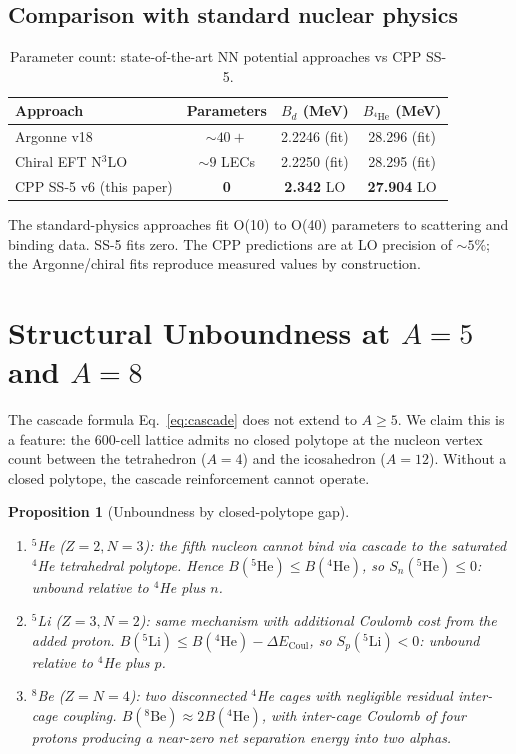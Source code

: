 \documentclass[11pt,letterpaper]{article}
\newtheorem{proposition}[theorem]{Proposition}
\newcommand{\Bd}{B_{d}}
\begin{document}
\subsection{Comparison with standard nuclear physics}

\begin{table}[H]
\centering
\caption{Parameter count: state-of-the-art NN potential approaches vs CPP SS-5.}
\label{tab:comparison}
\begin{tabular}{@{}lccc@{}}
\toprule
Approach & Parameters & $\Bd$ (MeV) & $B_{{}^4\mathrm{He}}$ (MeV) \\
\midrule
Argonne v18 & $\sim 40+$ & 2.2246 (fit) & 28.296 (fit) \\
Chiral EFT N$^3$LO & $\sim 9$ LECs & 2.2250 (fit) & 28.295 (fit) \\
CPP SS-5 v6 (this paper) & \textbf{0} & \textbf{2.342} LO & \textbf{27.904} LO \\
\bottomrule
\end{tabular}
\end{table}

The standard-physics approaches fit O(10) to O(40) parameters to scattering and binding data. SS-5 fits zero. The CPP predictions are at LO precision of $\sim 5\%$; the Argonne/chiral fits reproduce measured values by construction.

\section{Structural Unboundness at $A = 5$ and $A = 8$}
\label{sec:unbound}

The cascade formula Eq.~\ref{eq:cascade} does not extend to $A \geq 5$. We claim this is a feature: the 600-cell lattice admits no closed polytope at the nucleon vertex count between the tetrahedron ($A = 4$) and the icosahedron ($A = 12$). Without a closed polytope, the cascade reinforcement cannot operate.

\begin{proposition}[Unboundness by closed-polytope gap]
\label{prop:unbound}
\begin{enumerate}
\item ${}^5$He ($Z=2, N=3$): the fifth nucleon cannot bind via cascade to the saturated ${}^4$He tetrahedral polytope. Hence $B({}^5\text{He}) \leq B({}^4\text{He})$, so $S_n({}^5\text{He}) \leq 0$: unbound relative to ${}^4$He plus $n$.
\item ${}^5$Li ($Z=3, N=2$): same mechanism with additional Coulomb cost from the added proton. $B({}^5\text{Li}) \leq B({}^4\text{He}) - \Delta E_{\mathrm{Coul}}$, so $S_p({}^5\text{Li}) < 0$: unbound relative to ${}^4$He plus $p$.
\item ${}^8$Be ($Z=N=4$): two disconnected ${}^4$He cages with negligible residual inter-cage coupling. $B({}^8\text{Be}) \approx 2 B({}^4\text{He})$, with inter-cage Coulomb of four protons producing a near-zero net separation energy into two alphas.
\end{enumerate}
\end{proposition}
\end{document}
